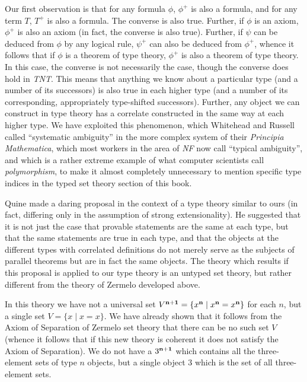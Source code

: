 \documentclass[12pt]{book}
\begin{document}
Our first observation is that for any formula $\phi$, $\phi^+$ is also
a formula, and for any term $T$, $T^+$ is also a formula.  The
converse is also true.  Further, if $\phi$ is an axiom, $\phi^+$ is
also an axiom (in fact, the converse is also true).  Further, if
$\psi$ can be deduced from $\phi$ by any logical rule, $\psi^+$ can
also be deduced from $\phi^+$, whence it follows that if $\phi$ is a
theorem of type theory, $\phi^+$ is also a theorem of type theory.  In
this case, the converse is not necessarily the case, though the
converse does hold in {\em TNT\/}.  This means that anything we know
about a particular type (and a number of its successors) is also true
in each higher type (and a number of its corresponding, appropriately
type-shifted successors).  Further, any object we can construct in
type theory has a correlate constructed in the same way at each higher
type.  We have exploited this phenomenon, which Whitehead and Russell
called ``systematic ambiguity'' in the more complex system of their
{\em Principia Mathematica\/}, which most workers in the area of {\em
NF\/} now call ``typical ambiguity'', and which is a rather extreme
example of what computer scientists call {\em polymorphism\/}, to make
it almost completely unnecessary to mention specific type indices in
the typed set theory section of this book.

Quine made a daring proposal in the context of a type theory similar
to ours (in fact, differing only in the assumption of strong
extensionality).  He suggested that it is not just the case that
provable statements are the same at each type, but that the same
statements are true in each type, and that the objects at the
different types with correlated definitions do not merely serve as the
subjects of parallel theorems but are in fact the same objects.  The
theory which results if this proposal is applied to our type theory is
an untyped set theory, but rather different from the theory of Zermelo
developed above.

In this theory we have not a universal set $V^{\bf n+1} = \{x^{\bf n}
\mid x^{\bf n} = x^{\bf n}\}$ for each $n$, but a single set $V = \{x
\mid x=x\}$.  We have already shown that it follows from the Axiom of
Separation of Zermelo set theory that there can be no such set $V$
(whence it follows that if this new theory is coherent it does not
satisfy the Axiom of Separation).  We do not have a $3^{\bf n + 1}$
which contains all the three-element sets of type $n$ objects, but a
single object 3 which is the set of all three-element sets.
\end{document}
